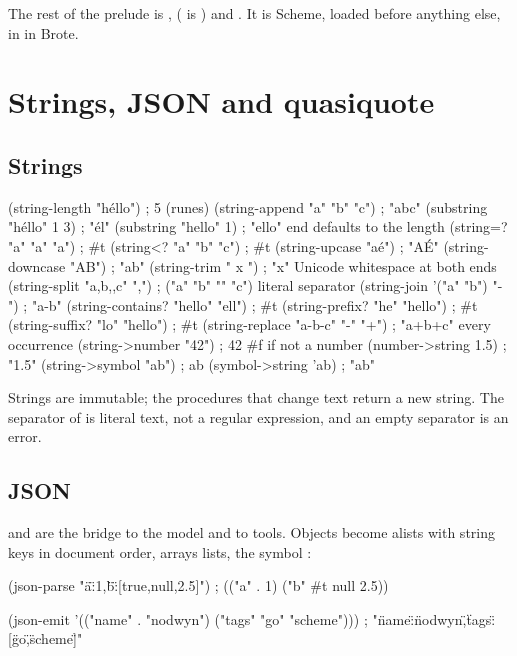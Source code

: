The rest of the prelude is , 
( is ) and .
It is Scheme, loaded before anything else, in
 in Brote.

\chapter{Strings, JSON and quasiquote}

\section{Strings}

\begin{scm}
(string-length "héllo")                  ; 5   (runes)
(string-append "a" "b" "c")              ; "abc"
(substring "héllo" 1 3)                  ; "él"
(substring "hello" 1)                    ; "ello"   end defaults to the length
(string=? "a" "a" "a")                   ; #t
(string<? "a" "b" "c")                   ; #t
(string-upcase "aé")                     ; "AÉ"
(string-downcase "AB")                   ; "ab"
(string-trim "  x \n")                   ; "x"   Unicode whitespace at both ends
(string-split "a,b,,c" ",")              ; ("a" "b" "" "c")   literal separator
(string-join '("a" "b") "-")             ; "a-b"
(string-contains? "hello" "ell")         ; #t
(string-prefix? "he" "hello")            ; #t
(string-suffix? "lo" "hello")            ; #t
(string-replace "a-b-c" "-" "+")         ; "a+b+c"   every occurrence
(string->number "42")                    ; 42       #f if not a number
(number->string 1.5)                     ; "1.5"
(string->symbol "ab")                    ; ab
(symbol->string 'ab)                     ; "ab"
\end{scm}

Strings are immutable; the procedures that change text return a new
string. The separator of  is literal text, not a regular
expression, and an empty separator is an error.

\section{JSON}

 and  are the bridge to the model and to
tools. Objects become alists with string keys in document order, arrays
lists,  the symbol :

\begin{scm}
(json-parse "{\"a\":1,\"b\":[true,null,2.5]}")
; (("a" . 1) ("b" #t null 2.5))

(json-emit '(("name" . "nodwyn") ("tags" "go" "scheme")))
; "{\"name\":\"nodwyn\",\"tags\":[\"go\",\"scheme\"]}"
\end{scm}

